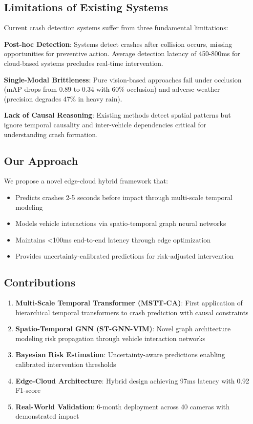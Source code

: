 \documentclass[conference]{IEEEtran}
\begin{document}
\subsection{Limitations of Existing Systems}

Current crash detection systems suffer from three fundamental limitations:

\textbf{Post-hoc Detection}: Systems detect crashes after collision occurs, missing opportunities for preventive action. Average detection latency of 450-800ms for cloud-based systems precludes real-time intervention.

\textbf{Single-Modal Brittleness}: Pure vision-based approaches fail under occlusion (mAP drops from 0.89 to 0.34 with 60\% occlusion) and adverse weather (precision degrades 47\% in heavy rain).

\textbf{Lack of Causal Reasoning}: Existing methods detect spatial patterns but ignore temporal causality and inter-vehicle dependencies critical for understanding crash formation.

\subsection{Our Approach}

We propose a novel edge-cloud hybrid framework that:
\begin{itemize}
\item Predicts crashes 2-5 seconds before impact through multi-scale temporal modeling
\item Models vehicle interactions via spatio-temporal graph neural networks
\item Maintains <100ms end-to-end latency through edge optimization
\item Provides uncertainty-calibrated predictions for risk-adjusted intervention
\end{itemize}

\subsection{Contributions}

\begin{enumerate}
\item \textbf{Multi-Scale Temporal Transformer (MSTT-CA)}: First application of hierarchical temporal transformers to crash prediction with causal constraints
\item \textbf{Spatio-Temporal GNN (ST-GNN-VIM)}: Novel graph architecture modeling risk propagation through vehicle interaction networks
\item \textbf{Bayesian Risk Estimation}: Uncertainty-aware predictions enabling calibrated intervention thresholds
\item \textbf{Edge-Cloud Architecture}: Hybrid design achieving 97ms latency with 0.92 F1-score
\item \textbf{Real-World Validation}: 6-month deployment across 40 cameras with demonstrated impact
\end{enumerate}
\end{document}
